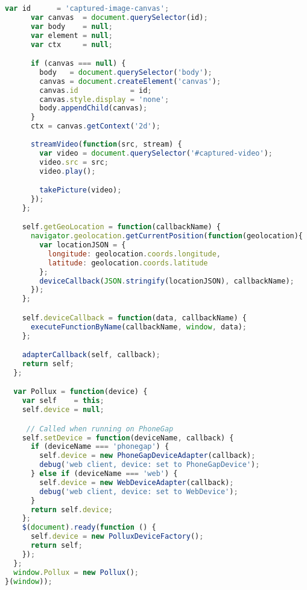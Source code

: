 \begin{lstlisting}[language=JavaScript]
      var id      = 'captured-image-canvas';
      var canvas  = document.querySelector(id);
      var body    = null;
      var element = null;
      var ctx     = null;

      if (canvas === null) {
        body   = document.querySelector('body');
        canvas = document.createElement('canvas');
        canvas.id            = id;
        canvas.style.display = 'none';
        body.appendChild(canvas);
      }
      ctx = canvas.getContext('2d');
      
      streamVideo(function(src, stream) {
        var video = document.querySelector('#captured-video');
        video.src = src;
        video.play();

        takePicture(video);
      });
    };

    self.getGeoLocation = function(callbackName) {
      navigator.geolocation.getCurrentPosition(function(geolocation){
        var locationJSON = {
          longitude: geolocation.coords.longitude,
          latitude: geolocation.coords.latitude
        };
        deviceCallback(JSON.stringify(locationJSON), callbackName);
      });
    };

    self.deviceCallback = function(data, callbackName) {
      executeFunctionByName(callbackName, window, data);
    };

    adapterCallback(self, callback);
    return self;
  };

  var Pollux = function(device) {
    var self    = this;
    self.device = null;

     // Called when running on PhoneGap
    self.setDevice = function(deviceName, callback) {
      if (deviceName === 'phonegap') {
        self.device = new PhoneGapDeviceAdapter(callback);
        debug('web client, device: set to PhoneGapDevice');
      } else if (deviceName === 'web') {
        self.device = new WebDeviceAdapter(callback);
        debug('web client, device: set to WebDevice');
      }
      return self.device;
    };
    $(document).ready(function () {  
      self.device = new PolluxDeviceFactory();
      return self;
    });
  };
  window.Pollux = new Pollux();
}(window));
\end{lstlisting}

\newpage